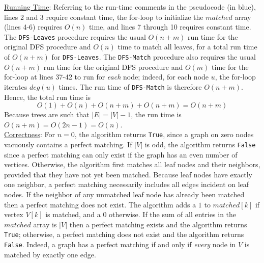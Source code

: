 \documentclass[twoside,11pt]{homework}
\begin{document}
\noindent
\underline{Running Time}:  Referring to the run-time comments in the pseudocode (in blue),  lines 2 and 3 require constant time,  the for-loop to initialize the $matched$ array (lines 4-6) requires $O(n)$ time,  and lines 7 through 10 requires constant time.  The \texttt{DFS-Leaves} procedure requires the usual $O(n+m)$ run time for the original DFS procedure and $O(n)$ time to match all leaves, for a total run time of $O(n+m)$ for \texttt{DFS-Leaves}.  The \texttt{DFS-Match} procedure also requires the usual $O(n+m)$ run time for the original DFS procedure and $O(m)$ time for the for-loop at lines 37-42 to run for \textit{each} node; indeed, for each node $u$, the for-loop iterates $deg(u)$ times. The run time of \texttt{DFS-Match} is therefore $O(n+m)$.  Hence, the total run time is $$O(1) + O(n) + O(n+m) + O(n+m) = O(n+m)$$
Because trees are such that $|E| = |V|-1$, the run time is $O(n+m) = O(2n-1) = O(n)$.  \\

\noindent
\underline{Correctness}:  For $n = 0$, the algorithm returns \texttt{True}, since a graph on zero nodes vacuously contains a perfect matching.  If $|V|$ is odd, the algorithm returns \texttt{False} since a perfect matching can only exist if the graph has an even number of vertices.  
Otherwise,  the algorithm first matches all leaf nodes and their neighbors, provided that they have not yet been matched. Because leaf nodes have exactly one neighbor, a perfect matching necessarily includes all edges incident on leaf nodes.  If the neighbor of any unmatched leaf node has already been matched then a perfect matching does not exist. The algorithm adds a $1$ to $matched[k]$ if vertex $V[k]$ is matched, and a $0$ otherwise.  If the sum of all entries in the $matched$ array is $|V|$ then a perfect matching exists and the algorithm returns \texttt{True}; otherwise, a perfect matching does not exist and the algorithm returns \texttt{False}.   Indeed,  a graph has a perfect matching if and only if \textit{every} node in $V$ is matched by exactly one edge. \\ \\

%
\end{document}
